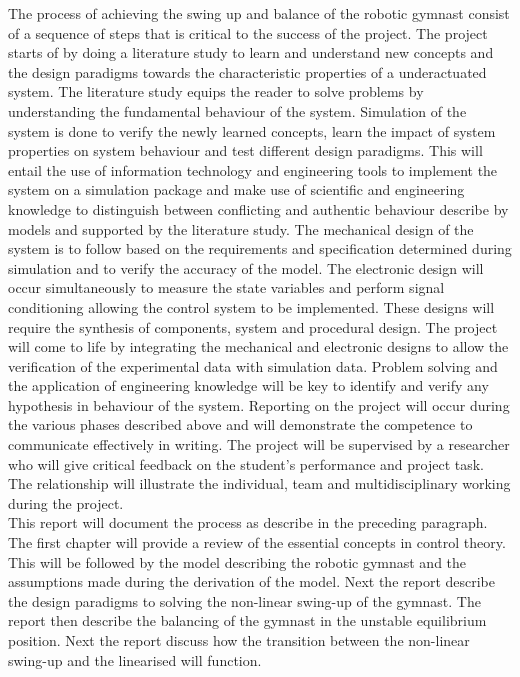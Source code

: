 \documentclass[a4paper,12pt]{article}
\begin{document}
	The process of achieving the swing up and balance of the robotic gymnast consist of a sequence of steps that is critical to the success of the project. The project starts of by doing a literature study to learn and understand new concepts and the design paradigms towards the characteristic properties of a underactuated system. The literature study equips the reader to solve problems by understanding the fundamental behaviour of the system. Simulation of the system is done to verify the newly learned concepts, learn the impact of system properties on system behaviour and test different design paradigms. This will entail the use of information technology and engineering tools to implement the system on a simulation package and make use of scientific and engineering knowledge to distinguish between conflicting and authentic behaviour describe by models and supported by the literature study. The mechanical design of the system is to follow based on the requirements and specification determined during simulation and to verify the accuracy of the model. The electronic design will occur simultaneously to measure the state variables and perform signal conditioning allowing the control system to be implemented. These designs will require the synthesis of components, system and procedural design. The project will come to life by integrating the mechanical and electronic designs to allow the verification of the experimental data with simulation data. Problem solving and the application of engineering knowledge will be key to identify and verify any hypothesis in behaviour of the system. Reporting on the project will occur during the various phases described above and will demonstrate the competence to communicate effectively in writing. The project will be supervised by a researcher who will give critical feedback on the student's performance and project task. The relationship will illustrate the individual, team and multidisciplinary working during the project.
	\\
	
	This report will document the process as describe in the preceding paragraph. The first chapter will provide a review of the essential concepts in control theory. This will be followed by the model describing the robotic gymnast and the assumptions made during the derivation of the model. Next the report describe the design paradigms to solving the non-linear swing-up of the gymnast. The report then describe the balancing of the gymnast in the unstable equilibrium position. Next the report discuss how the transition between the non-linear swing-up and the linearised will function.
	
\end{document}
